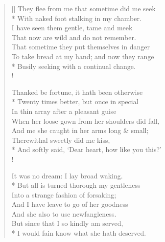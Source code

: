 \documentclass[MAIN]{subfiles}
\begin{document}
\settowidth{\versewidth}{They flee from me that sometime did me seek}
\begin{verse}[\versewidth]
They flee from me that sometime did me seek\\*
\vin With naked foot stalking in my chamber.\\
I have seen them gentle, tame and meek\\
\vin That now are wild and do not remember.\\
\vin That sometime they put themselves in danger\\
To take bread at my hand; and now they range\\*
Busily seeking with a continual change.\\!

Thanked be fortune, it hath been otherwise\\*
\vin Twenty times better, but once in special\\
In thin array after a pleasant guise\\
\vin When her loose gown from her shoulders did fall,\\
\vin And me she caught in her arms long \& small;\\
Therewithal sweetly did me kiss,\\*
And softly said, `Dear heart, how like you this?'\\!

It was no dream: I lay broad waking.\\*
\vin But all is turned thorough my gentleness\\
Into a strange fashion of forsaking;\\
\vin And I have leave to go of her goodness\\
\vin And she also to use newfangleness.\\
But since that I so kindly am served,\\*
I would fain know what she hath deserved.
\end{verse}
\end{document}
